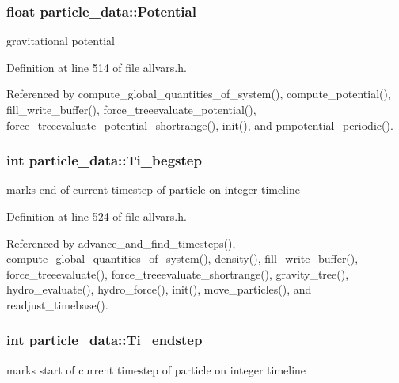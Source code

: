 \hypertarget{structparticle__data_a9d45a0cefc6121831905e169072550d0}{
\subsubsection[{Potential}]{\setlength{\rightskip}{0pt plus 5cm}float {\bf particle\_\-data::Potential}}}
\label{structparticle__data_a9d45a0cefc6121831905e169072550d0}
gravitational potential 

Definition at line 514 of file allvars.h.



Referenced by compute\_\-global\_\-quantities\_\-of\_\-system(), compute\_\-potential(), fill\_\-write\_\-buffer(), force\_\-treeevaluate\_\-potential(), force\_\-treeevaluate\_\-potential\_\-shortrange(), init(), and pmpotential\_\-periodic().

\hypertarget{structparticle__data_a6c9f057d234839cecaaeffc87b7a9794}{
\subsubsection[{Ti\_\-begstep}]{\setlength{\rightskip}{0pt plus 5cm}int {\bf particle\_\-data::Ti\_\-begstep}}}
\label{structparticle__data_a6c9f057d234839cecaaeffc87b7a9794}
marks end of current timestep of particle on integer timeline 

Definition at line 524 of file allvars.h.



Referenced by advance\_\-and\_\-find\_\-timesteps(), compute\_\-global\_\-quantities\_\-of\_\-system(), density(), fill\_\-write\_\-buffer(), force\_\-treeevaluate(), force\_\-treeevaluate\_\-shortrange(), gravity\_\-tree(), hydro\_\-evaluate(), hydro\_\-force(), init(), move\_\-particles(), and readjust\_\-timebase().

\hypertarget{structparticle__data_a9bf2c52c7378a961222d9fe8faa9c208}{
\subsubsection[{Ti\_\-endstep}]{\setlength{\rightskip}{0pt plus 5cm}int {\bf particle\_\-data::Ti\_\-endstep}}}
\label{structparticle__data_a9bf2c52c7378a961222d9fe8faa9c208}
marks start of current timestep of particle on integer timeline 

